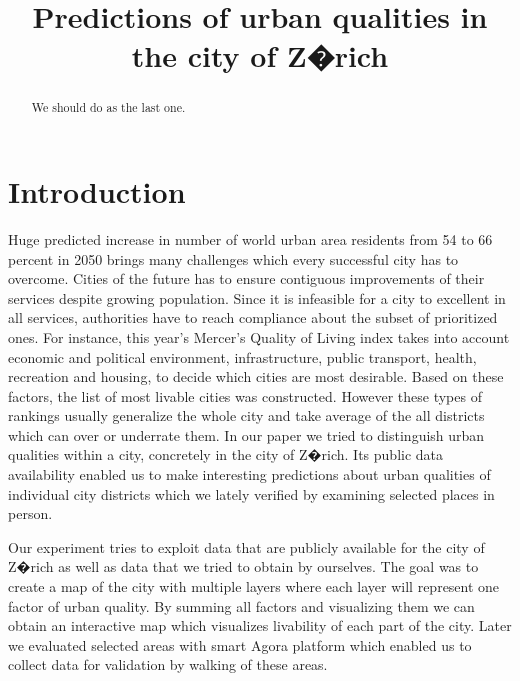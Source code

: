 \documentclass[letterpaper]{article}
\title{Predictions of urban qualities in the city of Z�rich}
\begin{document}
%
\maketitle
%

\begin{abstract}
We should do as the last one.
\end{abstract}

\section{Introduction}\label{sec:intro}
Huge predicted increase in number of world urban area residents from 54 to 66 percent in 2050 brings many challenges which every successful city has to overcome. Cities of the future has to ensure contiguous improvements of their services despite growing population. Since it is infeasible for a city to excellent in all services, authorities have to reach compliance about the subset of prioritized ones. For instance, this year's Mercer's Quality of Living index 
takes into account economic and political environment, infrastructure, public transport, health, recreation and housing, to decide which cities are most desirable. Based on these factors, the list of most livable cities was constructed. However these types of rankings usually generalize the whole city and take average of the all districts which can over or underrate them. In our paper we tried to distinguish urban qualities within a city, concretely in the city of Z�rich. Its public data availability enabled us to make interesting predictions about urban qualities of individual city districts which we lately verified by examining selected places in person. 

\indent Our experiment tries to exploit data that are publicly available for the city of Z�rich as well as data that we tried to obtain by ourselves. 
The goal was to create a map of the city with multiple layers where each layer will represent one factor of urban quality. By summing all factors and 
visualizing them we can obtain an interactive map which visualizes livability of each part of the city. Later we evaluated selected areas with smart
Agora platform which enabled us to collect data for validation by walking of these areas.

\end{document}
